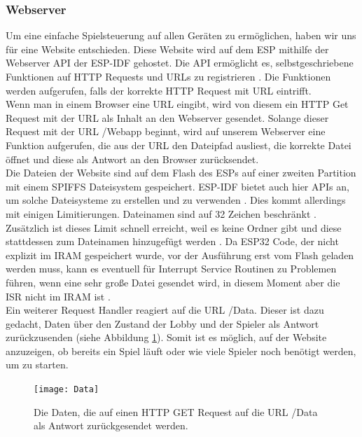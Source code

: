 \documentclass[12pt,a4paper]{article}
\begin{document}
\subsubsection{Webserver}
Um eine einfache Spielsteuerung auf allen Geräten zu ermöglichen, haben wir uns für eine Website entschieden. Diese Website wird auf dem ESP mithilfe der Webserver API der ESP-IDF gehostet. Die API ermöglicht es, selbstgeschriebene Funktionen auf HTTP Requests und URLs zu registrieren \cite{ESSPRESSIF:Reference}. Die Funktionen werden aufgerufen, falls der korrekte HTTP Request mit URL eintrifft.
\vspace{1ex}\\
Wenn man in einem Browser eine URL eingibt, wird von diesem ein HTTP Get Request mit der URL als Inhalt an den Webserver gesendet. Solange dieser Request mit der URL \dq/Webapp\dq{}  beginnt, wird auf unserem Webserver eine Funktion aufgerufen, die aus der URL den Dateipfad ausliest, die korrekte Datei öffnet und diese als Antwort an den Browser zurücksendet.
\vspace{1ex}\\
Die Dateien der Website sind auf dem Flash des ESPs auf einer zweiten Partition mit einem SPIFFS Dateisystem gespeichert. ESP-IDF bietet auch hier APIs an, um solche Dateisysteme zu erstellen und zu verwenden \cite{ESSPRESSIF:Reference}. Dies kommt allerdings mit einigen Limitierungen. Dateinamen sind auf 32 Zeichen beschränkt \cite{ESSPRESSIF:Reference}. Zusätzlich ist dieses Limit schnell erreicht, weil es keine Ordner gibt und diese stattdessen zum Dateinamen hinzugefügt werden \cite{ESSPRESSIF:Reference}. Da ESP32 Code, der nicht explizit im IRAM gespeichert wurde, vor der Ausführung erst vom Flash geladen werden muss, kann es eventuell für Interrupt Service Routinen zu Problemen führen, wenn eine sehr große Datei gesendet wird, in diesem Moment aber die ISR nicht im IRAM ist \cite{ESSPRESSIF:Reference}.
\vspace{1ex}\\
Ein weiterer Request Handler reagiert auf die URL  \dq/Data\dq{}. Dieser ist dazu gedacht, Daten über den Zustand der Lobby und der Spieler als Antwort zurückzusenden (siehe Abbildung \ref{fig:Data}). Somit ist es möglich, auf der Website anzuzeigen, ob bereits ein Spiel läuft oder wie viele Spieler noch benötigt werden, um zu starten.
\begin{figure}[h]
\centering
\texttt{[image: Data]}
\caption{\label{fig:Data}Die Daten, die auf einen HTTP GET Request auf die URL \dq/Data\dq{} als Antwort zurückgesendet werden.}
\end{figure}
\end{document}
